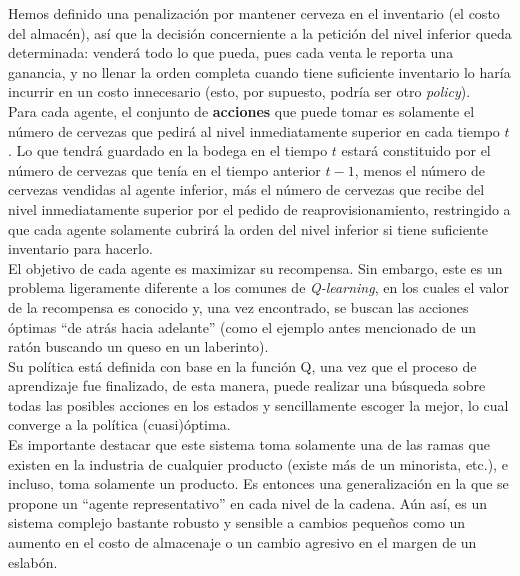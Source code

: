 Hemos definido una penalizaci\'on por mantener cerveza en el inventario (el costo del almac\'en), as\'i que la decisi\'on concerniente a la petici\'on del nivel inferior queda determinada: vender\'a todo lo que pueda, pues cada venta le reporta una ganancia, y no llenar la orden completa cuando tiene suficiente inventario lo har\'ia incurrir en un costo innecesario (esto, por supuesto, podr\'ia ser otro \textit{policy}).\\

Para cada agente, el conjunto de \textbf{acciones} que puede tomar es solamente el n\'umero de cervezas que pedir\'a al nivel inmediatamente superior en cada tiempo $t$. Lo que tendr\'a guardado en la bodega en el tiempo $t$ estar\'a constituido por el n\'umero de cervezas que ten\'ia en el tiempo anterior $t-1$, menos el n\'umero de cervezas vendidas al agente inferior, m\'as el n\'umero de cervezas que recibe del nivel inmediatamente superior por el pedido de reaprovisionamiento, restringido a que cada agente solamente cubrir\'a la orden del nivel inferior si tiene suficiente inventario para hacerlo.\\

El objetivo de cada agente es maximizar su recompensa. Sin embargo, este es un problema ligeramente diferente a los comunes de \textit{Q-learning}, en los cuales el valor de la recompensa es conocido y, una vez encontrado, se buscan las acciones \'optimas ``de atr\'as hacia adelante'' (como el ejemplo antes mencionado de un rat\'on buscando un queso en un laberinto).\\

Su pol\'itica est\'a definida con base en la funci\'on Q, una vez que el proceso de aprendizaje fue finalizado, de esta manera, puede realizar una b\'usqueda sobre todas las posibles acciones en los estados y sencillamente escoger la mejor, lo cual converge a la pol\'itica (cuasi)\'optima. \\

Es importante destacar que este sistema toma solamente una de las ramas que existen en la industria de cualquier producto (existe m\'as de un minorista, etc.), e incluso, toma solamente un producto. Es entonces una generalizaci\'on en la que se propone un ``agente representativo'' en cada nivel de la cadena. A\'un as\'i, es un sistema complejo bastante robusto y sensible a cambios peque\~nos como un aumento en el costo de almacenaje o un cambio agresivo en el margen de un eslab\'on.

